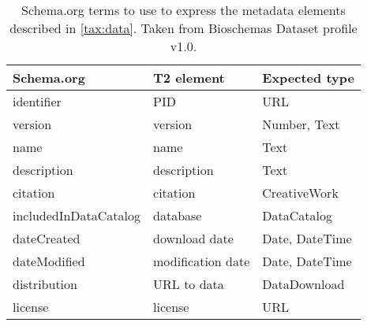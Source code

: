\begin{table}[bt!]
\caption{Schema.org terms to use to express the metadata elements described in \ref{tax:data}. Taken from Bioschemas Dataset profile v1.0.}\label{tab:dataset_bioschemas}
\begin{tabularx}{\linewidth}{l l L}
\toprule
Schema.org & T2 element & Expected type \\
\midrule
        identifier & PID & URL \\ %
        version & version & Number, Text \\ %
        name & name & Text \\ %
        description & description & Text \\ %
        citation & citation & CreativeWork \\ %
        includedInDataCatalog & database & DataCatalog \\ %
        dateCreated & download date & Date, DateTime \\ %
        dateModified & modification date & Date, DateTime \\ %
        distribution & URL to data & DataDownload \\ %
        license & license & URL \\ %
\bottomrule
\end{tabularx}
\end{table}
